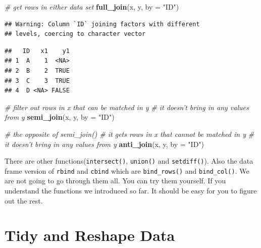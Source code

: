 \documentclass[12pt,]{krantz}
\makeatletter
\newenvironment{Shaded}{\begin{snugshade}}{\end{snugshade}}
\newcommand{\CommentTok}[1]{\textcolor[rgb]{0.37,0.37,0.37}{\textit{#1}}}
\newcommand{\DataTypeTok}[1]{\textcolor[rgb]{0.27,0.27,0.27}{#1}}
\newcommand{\KeywordTok}[1]{\textcolor[rgb]{0.27,0.27,0.27}{\textbf{#1}}}
\newcommand{\NormalTok}[1]{#1}
\newcommand{\StringTok}[1]{\textcolor[rgb]{0.5,0.5,0.5}{#1}}
\newenvironment{kframe}{%
\medskip{}
\setlength{\fboxsep}{.8em}
 \def\at@end@of@kframe{}%
 \ifinner\ifhmode%
  \def\at@end@of@kframe{\end{minipage}}%
  \begin{minipage}{\columnwidth}%
 \fi\fi%
 \def\FrameCommand##1{\hskip\@totalleftmargin \hskip-\fboxsep
 \colorbox{shadecolor}{##1}\hskip-\fboxsep
     \hskip-\linewidth \hskip-\@totalleftmargin \hskip\columnwidth}%
 \MakeFramed {\advance\hsize-\width
   \@totalleftmargin\z@ \linewidth\hsize
   \@setminipage}}%
 {\par\unskip\endMakeFramed%
 \at@end@of@kframe}
\renewenvironment{Shaded}{\begin{kframe}}{\end{kframe}}
\makeatother
\begin{document}
\begin{Shaded}
\begin{Highlighting}[]
\CommentTok{# get rows in either data set}
\KeywordTok{full_join}\NormalTok{(x, y, }\DataTypeTok{by =} \StringTok{"ID"}\NormalTok{)}
\end{Highlighting}
\end{Shaded}

\begin{verbatim}
## Warning: Column `ID` joining factors with different
## levels, coercing to character vector
\end{verbatim}

\begin{verbatim}
##   ID   x1    y1
## 1  A    1  <NA>
## 2  B    2  TRUE
## 3  C    3  TRUE
## 4  D <NA> FALSE
\end{verbatim}

\begin{Shaded}
\begin{Highlighting}[]
\CommentTok{# filter out rows in x that can be matched in y }
\CommentTok{# it doesn't bring in any values from y }
\KeywordTok{semi_join}\NormalTok{(x, y, }\DataTypeTok{by =} \StringTok{"ID"}\NormalTok{)}
\end{Highlighting}
\end{Shaded}

\begin{Shaded}
\begin{Highlighting}[]
\CommentTok{# the opposite of  semi_join()}
\CommentTok{# it gets rows in x that cannot be matched in y}
\CommentTok{# it doesn't bring in any values from y}
\KeywordTok{anti_join}\NormalTok{(x, y, }\DataTypeTok{by =} \StringTok{"ID"}\NormalTok{)}
\end{Highlighting}
\end{Shaded}

There are other functions(\texttt{intersect()}, \texttt{union()} and \texttt{setdiff()}). Also the data frame version of \texttt{rbind} and \texttt{cbind} which are \texttt{bind\_rows()} and \texttt{bind\_col()}. We are not going to go through them all. You can try them yourself. If you understand the functions we introduced so far. It should be easy for you to figure out the rest.

\hypertarget{tidy-and-reshape-data}{%
\section{Tidy and Reshape Data}\label{tidy-and-reshape-data}}
\end{document}
